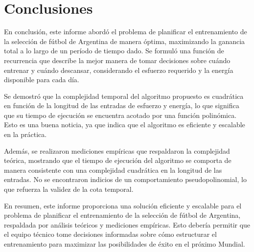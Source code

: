\section{Conclusiones}

En conclusión, este informe abordó el problema de planificar el entrenamiento de la selección de fútbol de Argentina de manera óptima, maximizando la ganancia total a lo largo de un período de tiempo dado. Se formuló una función de recurrencia que describe la mejor manera de tomar decisiones sobre cuándo entrenar y cuándo descansar, considerando el esfuerzo requerido y la energía disponible para cada día. 

Se demostró que la complejidad temporal del algoritmo propuesto es cuadrática en función de la longitud de las entradas de esfuerzo y energía, lo que significa que su tiempo de ejecución se encuentra acotado por una función polinómica. Esto es una buena noticia, ya que indica que el algoritmo es eficiente y escalable en la práctica.

Además, se realizaron mediciones empíricas que respaldaron la complejidad teórica, mostrando que el tiempo de ejecución del algoritmo se comporta de manera consistente con una complejidad cuadrática en la longitud de las entradas. No se encontraron indicios de un comportamiento pseudopolinomial, lo que refuerza la validez de la cota temporal.

En resumen, este informe proporciona una solución eficiente y escalable para el problema de planificar el entrenamiento de la selección de fútbol de Argentina, respaldada por análisis teóricos y mediciones empíricas. Esto debería permitir que el equipo técnico tome decisiones informadas sobre cómo estructurar el entrenamiento para maximizar las posibilidades de éxito en el próximo Mundial.